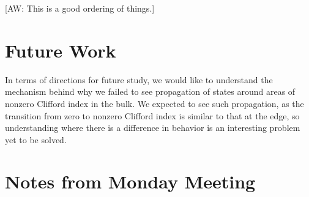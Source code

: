 \documentclass[a4paper]{article}
\newcommand{\aw}[1]{{\color{blue} [AW: #1]}}
\begin{document}
\aw{This is a good ordering of things.}

\section{Future Work}

In terms of directions for future study, we would like to understand the mechanism behind why we failed to see propagation of states around areas of nonzero Clifford index in the bulk. We expected to see such propagation, as the transition from zero to nonzero Clifford index is similar to that at the edge, so understanding where there is a difference in behavior is an interesting problem yet to be solved.

\section{Notes from Monday Meeting}

\printbibliography
\end{document}
